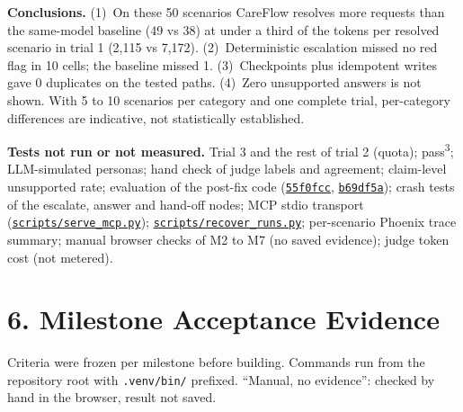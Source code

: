 \documentclass[10pt,a4paper]{article}
\newcommand{\repourl}{https://github.com/saideepaksana/careflow}
\newcommand{\rev}{cs5903-final-2026}
\newcommand{\file}[1]{\href{\repourl/blob/\rev/#1}{\nolinkurl{#1}}}
\newcommand{\commit}[1]{\href{\repourl/commit/#1}{\texttt{#1}}}
\begin{document}
\textbf{Conclusions.} (1)~On these 50 scenarios CareFlow resolves more requests than the same-model baseline (49 vs 38) at under a third of the tokens per resolved scenario in trial 1 (2,115 vs 7,172). (2)~Deterministic escalation missed no red flag in 10 cells; the baseline missed 1. (3)~Checkpoints plus idempotent writes gave 0 duplicates on the tested paths. (4)~Zero unsupported answers is not shown. With 5 to 10 scenarios per category and one complete trial, per-category differences are indicative, not statistically established.

\textbf{Tests not run or not measured.} Trial 3 and the rest of trial 2 (quota); pass\textsuperscript{3}; LLM-simulated personas; hand check of judge labels and agreement; claim-level unsupported rate; evaluation of the post-fix code (\commit{55f0fcc}, \commit{b69df5a}); crash tests of the escalate, answer and hand-off nodes; MCP stdio transport (\file{scripts/serve_mcp.py}); \file{scripts/recover_runs.py}; per-scenario Phoenix trace summary; manual browser checks of M2 to M7 (no saved evidence); judge token cost (not metered).

\FloatBarrier
\section*{6. Milestone Acceptance Evidence}

Criteria were frozen per milestone before building. Commands run from the repository root with \texttt{.venv/bin/} prefixed. ``Manual, no evidence'': checked by hand in the browser, result not saved.
\end{document}
